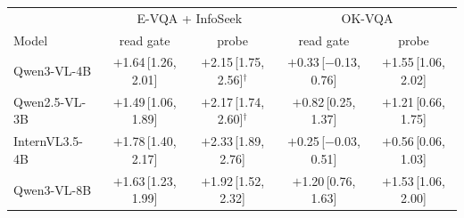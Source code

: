 \begin{tabular}{@{}lcccc@{}}
\toprule
 & \multicolumn{2}{c}{E-VQA + InfoSeek} & \multicolumn{2}{c}{OK-VQA} \\
Model & read gate & probe & read gate & probe \\
\midrule
Qwen3-VL-4B & $+$1.64\,{\scriptsize[1.26, 2.01]} & $+$2.15\,{\scriptsize[1.75, 2.56]}$^{\dagger}$ & $+$0.33\,{\scriptsize[$-$0.13, 0.76]} & $+$1.55\,{\scriptsize[1.06, 2.02]} \\
Qwen2.5-VL-3B & $+$1.49\,{\scriptsize[1.06, 1.89]} & $+$2.17\,{\scriptsize[1.74, 2.60]}$^{\dagger}$ & $+$0.82\,{\scriptsize[0.25, 1.37]} & $+$1.21\,{\scriptsize[0.66, 1.75]} \\
InternVL3.5-4B & $+$1.78\,{\scriptsize[1.40, 2.17]} & $+$2.33\,{\scriptsize[1.89, 2.76]} & $+$0.25\,{\scriptsize[$-$0.03, 0.51]} & $+$0.56\,{\scriptsize[0.06, 1.03]} \\
Qwen3-VL-8B & $+$1.63\,{\scriptsize[1.23, 1.99]} & $+$1.92\,{\scriptsize[1.52, 2.32]} & $+$1.20\,{\scriptsize[0.76, 1.63]} & $+$1.53\,{\scriptsize[1.06, 2.00]} \\
\bottomrule
\end{tabular}
